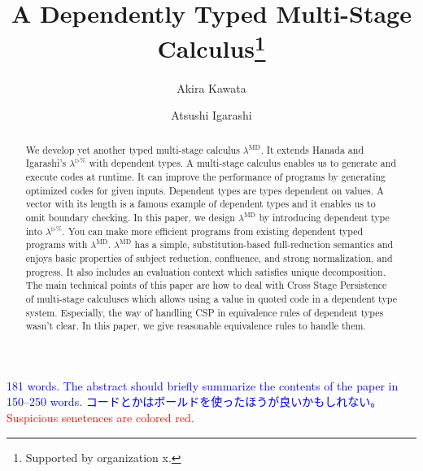 \documentclass[runningheads]{llncs}
\newcommand{\red}[1]{\textcolor{red}{#1 }}
\newcommand{\blue}[1]{\textcolor{blue}{#1 }}
\newcommand{\LTP}{$\lambda^{\triangleright\%}$\xspace}
\newcommand{\LMD}{$\lambda^{\textrm{MD}}$\xspace}
\newcommand{\TW}{\triangleright}
\begin{document}
%
\title{A Dependently Typed Multi-Stage Calculus\thanks{Supported by organization x.}}
%
%
\author{Akira Kawata \and
    Atsushi Igarashi}
%
%
%
\maketitle              %
%
\begin{abstract}

    We develop yet another typed multi-stage calculus \LMD.
    It extends Hanada and Igarashi's \LTP with dependent types.
    A multi-stage calculus enables us to generate and execute codes at runtime.
    It can improve the performance of programs by generating optimized codes for given inputs.
    Dependent types are types dependent on values. 
    A vector with its length is a famous example of dependent types and it enables us to omit boundary checking.
    In this paper, we design \LMD by introducing dependent type into $\lambda^{\TW\%}$.
    You can make more efficient programs from existing dependent typed programs with \LMD.
    \LMD has a simple, substitution-based full-reduction semantics and enjoys basic properties of subject reduction, confluence, and strong normalization, and progress.
    It also includes an evaluation context which satisfies unique decomposition.
    The main technical points of this paper are how to deal with Cross Stage Persistence of multi-stage calculuses which allows using a value in quoted code in a dependent type system.
    Especially, the way of handling CSP in equivalence rules of dependent types wasn't clear.
    In this paper, we give reasonable equivalence rules to handle them.
    
\end{abstract}

\blue{181 words. The abstract should briefly summarize the contents of the paper in 150--250 words.}
\blue{コードとかはボールドを使ったほうが良いかもしれない。}
\red{Suspicious senetences are colored red.}
%
%
%
\end{document}
